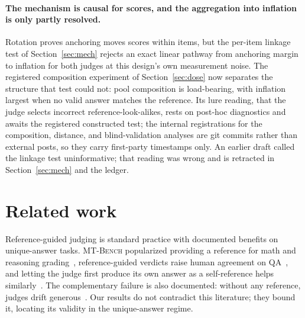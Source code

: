 \documentclass[11pt]{article}
\begin{document}
\paragraph{The mechanism is causal for scores, and the aggregation into inflation is only partly resolved.}
Rotation proves anchoring moves scores within items, but the per-item linkage test of Section~\ref{sec:mech} rejects an exact linear pathway from anchoring margin to inflation for both judges at this design's own measurement noise.
The registered composition experiment of Section~\ref{sec:dose} now separates the structure that test could not: pool composition is load-bearing, with inflation largest when no valid answer matches the reference.
Its lure reading, that the judge selects incorrect reference-look-alikes, rests on post-hoc diagnostics and awaits the registered constructed test; the internal registrations for the composition, distance, and blind-validation analyses are git commits rather than external posts, so they carry first-party timestamps only.
An earlier draft called the linkage test uninformative; that reading was wrong and is retracted in Section~\ref{sec:mech} and the ledger.

\section{Related work}

Reference-guided judging is standard practice with documented benefits on unique-answer tasks.
\textsc{MT-Bench} popularized providing a reference for math and reasoning grading~\cite{zheng2023judging}, reference-guided verdicts raise human agreement on QA~\cite{refguided2024}, and letting the judge first produce its own answer as a self-reference helps similarly~\cite{dobefore2025}.
The complementary failure is also documented: without any reference, judges drift generous~\cite{generous2026}.
Our results do not contradict this literature; they bound it, locating its validity in the unique-answer regime.
\end{document}
